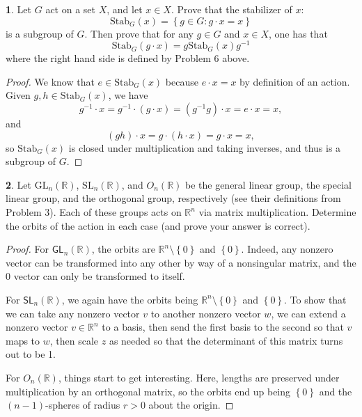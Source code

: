 \documentclass[12pt]{article}
\theoremstyle{definition}
\newtheorem{ex}{}
\begin{document}
\begin{ex}
	Let $G$ act on a set $X$, and let $x \in X$.
	Prove that the stabilizer of $x$: \begin{equation*}
		\mathrm{Stab}_G(x) = \left\lbrace g \in G : g \cdot x = x \right\rbrace
	\end{equation*}
	is a subgroup of $G$.
	Then prove that for any $g \in G$ and $x \in X$, one has that \begin{equation*}
		\mathrm{Stab}_G(g \cdot x) = g \mathrm{Stab}_G(x)g^{-1}
	\end{equation*}
	where the right hand side is defined by Problem 6 above.
\end{ex}
\begin{proof}
	We know that $e \in \mathrm{Stab}_G(x)$ because $e\cdot x = x$ by definition of an action.
	Given $g, h \in \mathrm{Stab}_G(x)$, we have \begin{equation*}
		g^{-1}\cdot x = g^{-1} \cdot (g \cdot x) = (g^{-1}g) \cdot x = e \cdot x = x,
	\end{equation*}
	and \begin{equation*}
		(gh) \cdot x = g \cdot (h \cdot x) = g \cdot x = x,
	\end{equation*}
	so $\mathrm{Stab}_G(x)$ is closed under multiplication and taking inverses, and thus is a subgroup of $G$.
\end{proof}

\begin{ex}
	Let $\mathrm{GL}_n(\mathbb{R})$, $\mathrm{SL}_n(\mathbb{R})$, and $O_n(\mathbb{R})$ be the general linear group, the special linear group, and the orthogonal group, respectively (see their definitions from Problem 3).
	Each of these groups acts on $\mathbb{R}^n$ via matrix multiplication.
	Determine the orbits of the action in each case (and prove your answer is correct).
\end{ex}
\begin{proof}
	For $\mathsf{GL}_n(\mathbb{R})$, the orbits are $\mathbb{R}^n \setminus \left\lbrace 0 \right\rbrace$ and $\left\lbrace 0 \right\rbrace$.
  Indeed, any nonzero vector can be transformed into any other by way of a nonsingular matrix, and the 0 vector can only be transformed to itself.

	For $\mathsf{SL}_n(\mathbb{R})$, we again have the orbits being $\mathbb{R}^n \setminus \left\lbrace 0 \right\rbrace$ and $\left\lbrace 0 \right\rbrace$.
  To show that we can take any nonzero vector $v$ to another nonzero vector $w$, we can extend a nonzero vector $v \in \mathbb{R}^n$ to a basis, then send the first basis to the second so that $v$ maps to $w$, then scale $z$ as needed so that the determinant of this matrix turns out to be 1.

  For $O_n(\mathbb{R})$, things start to get interesting.
  Here, lengths are preserved under multiplication by an orthogonal matrix, so the orbits end up being $\left\lbrace 0 \right\rbrace$ and the $(n-1)$-spheres of radius $r > 0$ about the origin.
\end{proof}
\end{document}
